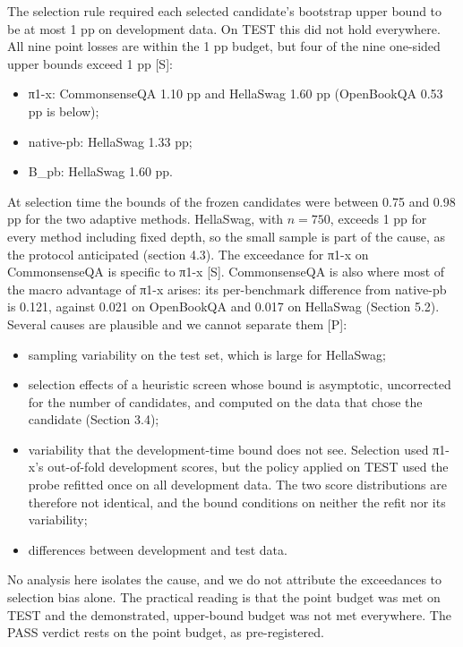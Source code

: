 The selection rule required each selected candidate's bootstrap upper bound to be at most 1 pp on development data. On TEST this did not hold everywhere. All nine point losses are within the 1 pp budget, but four of the nine one-sided upper bounds exceed 1 pp {[}S{]}:

\begin{itemize}
\tightlist
\item
  π1-x: CommonsenseQA 1.10 pp and HellaSwag 1.60 pp (OpenBookQA 0.53 pp is below);
\item
  native-pb: HellaSwag 1.33 pp;
\item
  B\_pb: HellaSwag 1.60 pp.
\end{itemize}

At selection time the bounds of the frozen candidates were between 0.75 and 0.98 pp for the two adaptive methods. HellaSwag, with \(n = 750\), exceeds 1 pp for every method including fixed depth, so the small sample is part of the cause, as the protocol anticipated (section 4.3). The exceedance for π1-x on CommonsenseQA is specific to π1-x {[}S{]}. CommonsenseQA is also where most of the macro advantage of π1-x arises: its per-benchmark difference from native-pb is 0.121, against 0.021 on OpenBookQA and 0.017 on HellaSwag (Section 5.2). Several causes are plausible and we cannot separate them {[}P{]}:

\begin{itemize}
\tightlist
\item
  sampling variability on the test set, which is large for HellaSwag;
\item
  selection effects of a heuristic screen whose bound is asymptotic, uncorrected for the number of candidates, and computed on the data that chose the candidate (Section 3.4);
\item
  variability that the development-time bound does not see. Selection used π1-x's out-of-fold development scores, but the policy applied on TEST used the probe refitted once on all development data. The two score distributions are therefore not identical, and the bound conditions on neither the refit nor its variability;
\item
  differences between development and test data.
\end{itemize}

No analysis here isolates the cause, and we do not attribute the exceedances to selection bias alone. The practical reading is that the point budget was met on TEST and the demonstrated, upper-bound budget was not met everywhere. The PASS verdict rests on the point budget, as pre-registered.

